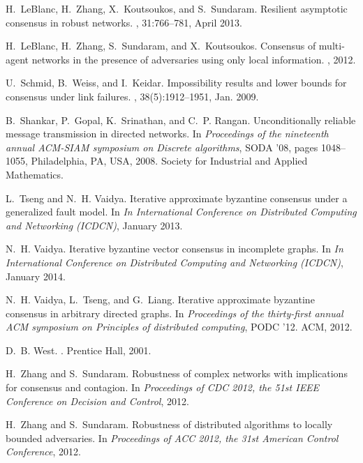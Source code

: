 \documentclass[letterpaper, 11pt]{article}
\begin{document}
\begin{thebibliography}{10}
H.~LeBlanc, H.~Zhang, X.~Koutsoukos, and S.~Sundaram.
\newblock Resilient asymptotic consensus in robust networks.
, 31:766--781, April 2013.

H.~LeBlanc, H.~Zhang, S.~Sundaram, and X.~Koutsoukos.
\newblock Consensus of multi-agent networks in the presence of adversaries
  using only local information.
, 2012.

U.~Schmid, B.~Weiss, and I.~Keidar.
\newblock Impossibility results and lower bounds for consensus under link
  failures.
, 38(5):1912--1951, Jan. 2009.

B.~Shankar, P.~Gopal, K.~Srinathan, and C.~P. Rangan.
\newblock Unconditionally reliable message transmission in directed networks.
\newblock In {\em Proceedings of the nineteenth annual ACM-SIAM symposium on
  Discrete algorithms}, SODA '08, pages 1048--1055, Philadelphia, PA, USA,
  2008. Society for Industrial and Applied Mathematics.

L.~Tseng and N.~H. Vaidya.
\newblock Iterative approximate byzantine consensus under a generalized fault
  model.
\newblock In {\em In International Conference on Distributed Computing and
  Networking (ICDCN)}, January 2013.

N.~H. Vaidya.
\newblock Iterative byzantine vector consensus in incomplete graphs.
\newblock In {\em In International Conference on Distributed Computing and
  Networking (ICDCN)}, January 2014.

N.~H. Vaidya, L.~Tseng, and G.~Liang.
\newblock Iterative approximate byzantine consensus in arbitrary directed
  graphs.
\newblock In {\em Proceedings of the thirty-first annual ACM symposium on
  Principles of distributed computing}, PODC '12. ACM, 2012.

D.~B. West.
.
\newblock Prentice Hall, 2001.

H.~Zhang and S.~Sundaram.
\newblock Robustness of complex networks with implications for consensus and
  contagion.
\newblock In {\em Proceedings of CDC 2012, the 51st IEEE Conference on Decision
  and Control}, 2012.

H.~Zhang and S.~Sundaram.
\newblock Robustness of distributed algorithms to locally bounded adversaries.
\newblock In {\em Proceedings of ACC 2012, the 31st American Control
  Conference}, 2012.

\end{thebibliography}
\end{document}
